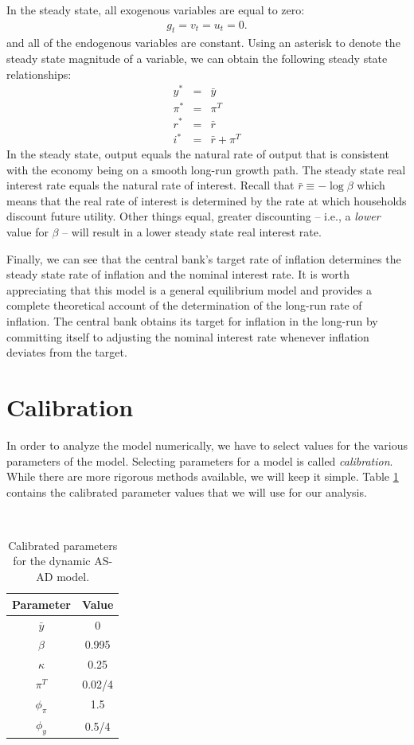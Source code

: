 \documentclass[12pt,fleqn]{article}
\newcommand{\EE}{\begin{eqnarray}}
\newcommand{\FF}{\end{eqnarray}}
\begin{document}
In the steady state, all exogenous variables are equal to zero:
	\EE
	g_t = v_t = u_t = 0.
	\FF
and all of the endogenous variables are constant. Using an asterisk to denote the steady state magnitude of a variable, we can obtain the following steady state relationships:
	\EE
	y^* & = & \bar{y}\\
	\pi^* & = & \pi^T\\
	r^* & = & \bar{r}\\
	i^* & = & \bar{r} + \pi^T
	\FF
In the steady state, output equals the natural rate of output that is consistent with the economy being on a smooth long-run growth path. The steady state real interest rate equals the natural rate of interest. Recall that $\bar{r} \equiv - \log  \beta$ which means that the real rate of interest is determined by the rate at which households discount future utility. Other things equal, greater discounting -- i.e., a \emph{lower} value for $\beta$ -- will result in a lower steady state real interest rate.

Finally, we can see that the central bank's target rate of inflation determines the steady state rate of inflation and the nominal interest rate. It is worth appreciating that this model is a general equilibrium model and provides a complete theoretical account of the determination of the long-run rate of inflation. The central bank obtains its target for inflation in the long-run by committing itself to adjusting the nominal interest rate whenever inflation deviates from the target.
	
\section{Calibration}

In order to analyze the model numerically, we have to select values for the various parameters of the model. Selecting parameters for a model is called \emph{calibration}. While there are more rigorous methods available, we will keep it simple. Table \ref{table_calib} contains the calibrated parameter values that we will use for our analysis.

\begin{table}[h] \caption{\label{table_calib} Calibrated parameters for the dynamic AS-AD model.}

\

\begin{center}\begin{tabular}{|c|c|} \hline \textbf{Parameter} & \textbf{Value}\\\hline
{\rule[3mm]{0mm}{0mm}} $\bar{y}$   & 0 \\
                       $\beta$     & 0.995\\
                       $\kappa$    & 0.25\\
                       $\pi^T$     & 0.02/4   \\
                       $\phi_{\pi}$& 1.5 \\
                       $\phi_{y}$  & 0.5/4\\\hline
\end{tabular}\end{center}
\end{table}
\end{document}

